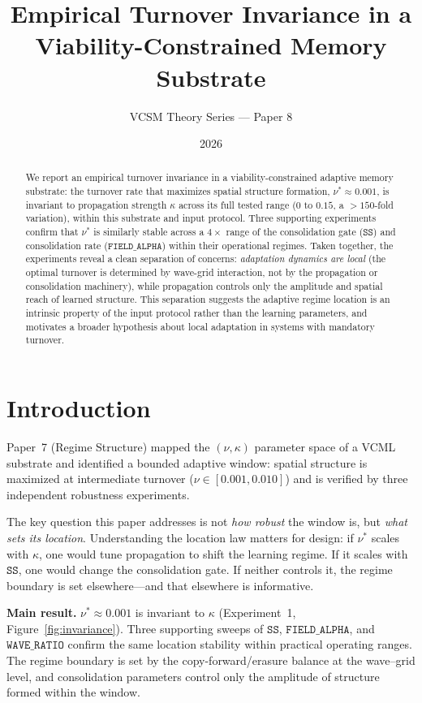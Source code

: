 \documentclass[11pt]{article}
\title{Empirical Turnover Invariance in a\\Viability-Constrained Memory Substrate}
\author{VCSM Theory Series --- Paper 8}
\date{2026}
\theoremstyle{remark}
\begin{document}
\maketitle

\begin{abstract}
We report an empirical turnover invariance in a viability-constrained adaptive memory
substrate: the turnover rate that maximizes spatial structure formation, $\nu^* \approx
0.001$, is invariant to propagation strength $\kappa$ across its full tested range
($0$ to $0.15$, a $>150$-fold variation), within this substrate and input protocol.
Three supporting experiments confirm that $\nu^*$ is similarly stable across a
$4\times$ range of the consolidation gate ($\mathtt{SS}$) and consolidation rate
($\mathtt{FIELD\_ALPHA}$) within their operational regimes. Taken together, the
experiments reveal a clean separation of concerns: \emph{adaptation dynamics are local}
(the optimal turnover is determined by wave-grid interaction, not by the propagation or
consolidation machinery), while propagation controls only the amplitude and spatial reach
of learned structure. This separation suggests the adaptive regime location is an
intrinsic property of the input protocol rather than the learning parameters, and
motivates a broader hypothesis about local adaptation in systems with mandatory turnover.
\end{abstract}

\section{Introduction}

Paper~7 (Regime Structure) mapped the $(\nu, \kappa)$ parameter space of a VCML
substrate and identified a bounded adaptive window: spatial structure is maximized
at intermediate turnover ($\nu \in [0.001, 0.010]$) and is verified by three
independent robustness experiments.

The key question this paper addresses is not \emph{how robust} the window is, but
\emph{what sets its location}. Understanding the location law matters for design:
if $\nu^*$ scales with $\kappa$, one would tune propagation to shift the learning
regime. If it scales with $\mathtt{SS}$, one would change the consolidation gate.
If neither controls it, the regime boundary is set elsewhere---and that elsewhere is
informative.

\textbf{Main result.} $\nu^* \approx 0.001$ is invariant to $\kappa$ (Experiment~1,
Figure~\ref{fig:invariance}). Three supporting sweeps of $\mathtt{SS}$,
$\mathtt{FIELD\_ALPHA}$, and $\mathtt{WAVE\_RATIO}$ confirm the same location
stability within practical operating ranges. The regime boundary is set by the
copy-forward/erasure balance at the wave--grid level, and consolidation parameters
control only the amplitude of structure formed within the window.
\end{document}
